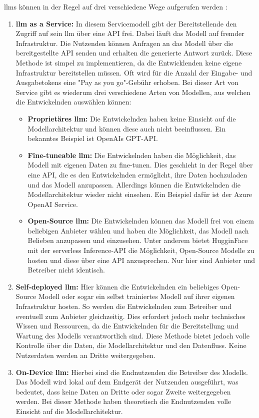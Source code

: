 \acp{llm} können in der Regel auf drei verschiedene Wege aufgerufen werden \cite{llm-privacy}:
\begin{enumerate}
    \item \textbf{\ac{llm} as a Service:} In diesem Servicemodell gibt der Bereitstellende den Zugriff auf sein \ac{llm} über eine API frei. Dabei läuft das Modell auf fremder Infrastruktur. Die Nutzenden können Anfragen an das Modell über die bereitgestellte API senden und erhalten die generierte Antwort zurück. Diese Methode ist simpel zu implementieren, da die Entwicklenden keine eigene Infrastruktur bereitstellen müssen. Oft wird für die Anzahl der Eingabe- und Ausgabetokens eine "Pay as you go"-Gebühr erhoben.
    Bei dieser Art von Service gibt es wiederum drei verschiedene Arten von Modellen, aus welchen die Entwickelnden auswählen können:
    \begin{itemize}
        \item \textbf{Proprietäres \ac{llm}:} Die Entwickelnden haben keine Einsicht auf die Modellarchitektur und können diese auch nicht beeinflussen. Ein bekanntes Beispiel ist OpenAIs GPT-API. 
        \item \textbf{Fine-tuneable \ac{llm}:} Die Entwickelnden haben die Möglichkeit, das Modell mit eigenen Daten zu fine-tunen. Dies geschieht in der Regel über eine API, die es den Entwickelnden ermöglicht, ihre Daten hochzuladen und das Modell anzupassen. Allerdings können die Entwickelnden die Modellarchitektur wieder nicht einsehen. Ein Beispiel dafür ist der Azure OpenAI Service.
        \item \textbf{Open-Source \ac{llm}:} Die Entwickelnden können das Modell frei von einem beliebigen Anbieter wählen und haben die Möglichkeit, das Modell nach Belieben anzupassen und einzusehen. Unter anderem bietet HugginFace mit der serverless Inference-API die Möglichkeit, Open-Source Modelle zu hosten und diese über eine API anzusprechen. Nur hier sind Anbieter und Betreiber nicht identisch.
    \end{itemize}
    \item \textbf{Self-deployed \ac{llm}:} Hier können die Entwickelnden ein beliebiges Open-Source Modell oder sogar ein selbst trainiertes Modell auf ihrer eigenen Infrastruktur hosten. So werden die Entwickelnden zum Betreiber und eventuell zum Anbieter gleichzeitig. Dies erfordert jedoch mehr technisches Wissen und Ressourcen, da die Entwickelnden für die Bereitstellung und Wartung des Modells verantwortlich sind. Diese Methode bietet jedoch volle Kontrolle über die Daten, die Modellarchitektur und den Datenfluss. Keine Nutzerdaten werden an Dritte weitergegeben.
    \item \textbf{On-Device \ac{llm}:} Hierbei sind die Endnutzenden die Betreiber des Modells. Das Modell wird lokal auf dem Endgerät der Nutzenden ausgeführt, was bedeutet, dass keine Daten an Dritte oder sogar Zweite weitergegeben werden. Bei dieser Methode haben theoretisch die Endnutzenden volle Einsicht auf die Modellarchitektur. 
\end{enumerate}


